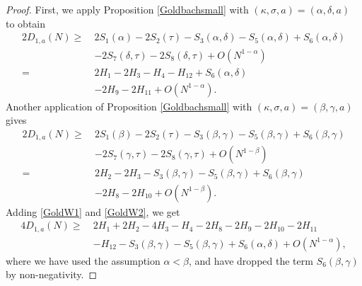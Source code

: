\documentclass[12pt, a4paper]{amsart}
\def\ge{\geqslant}
\theoremstyle{plain}
\theoremstyle{remark}
\numberwithin{equation}{section}
\begin{document}
\begin{proof}
First, we apply Proposition \ref{Goldbachsmall} with $(\kappa,\sigma,a)=(\alpha,\delta,a)$ to obtain
\begin{equation}\label{GoldW1}
\begin{split}
2D_{1,a}(N)\ge\ & 2S_1(\alpha)-2S_2(\tau)-S_3(\alpha,\delta)-S_5(\alpha,\delta)+S_6(\alpha,\delta)\\
&-2S_7(\delta,\tau)-2S_8(\delta,\tau)+O(N^{1-\alpha})\\
=\ & 2H_1-2H_3-H_4-H_{12}+S_6(\alpha,\delta)\\ 
& -2H_9-2H_{11}+O(N^{1-\alpha}). 
\end{split}
\end{equation}
Another application of Proposition \ref{Goldbachsmall} with $(\kappa,\sigma,a)=(\beta,\gamma,a)$ gives 
\begin{equation}\label{GoldW2}
\begin{split}
2D_{1,a}(N)
\ge\ & 2S_1(\beta)-2S_2(\tau)-S_3(\beta,\gamma)-S_5(\beta,\gamma)+S_6(\beta,\gamma)\\
& -2S_7(\gamma,\tau)-2S_8(\gamma,\tau)+O(N^{1-\beta})\\
=\ & 2H_2-2H_3-S_3(\beta,\gamma)-S_5(\beta,\gamma)+S_6(\beta,\gamma) \\ 
& -2H_8-2H_{10}+O(N^{1-\beta}).
\end{split}
\end{equation}
Adding \eqref{GoldW1} and \eqref{GoldW2}, we get 
\begin{equation}\label{GoldW3}
\begin{split}
4D_{1,a}(N)\ge\ & 2H_1+2H_2-4H_3-H_4-2H_8-2H_9-2H_{10}-2H_{11}\\
& -H_{12} -S_3(\beta,\gamma)-S_5(\beta,\gamma)+S_6(\alpha,\delta)+O(N^{1-\alpha}),
\end{split}
\end{equation}
where we have used the assumption $\alpha<\beta$, and have dropped the term $S_6(\beta,\gamma)$ by non-negativity. 


\end{proof}
\end{document}
